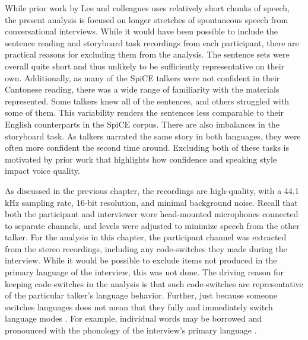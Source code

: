 While prior work by Lee and colleagues \citep[e.g.,][]{lee_2019_acoustic} uses relatively short chunks of speech, the present analysis is focused on longer stretches of spontaneous speech from conversational interviews. While it would have been possible to include the sentence reading and storyboard task recordings from each participant, there are practical reasons for excluding them from the analysis. The sentence sets were overall quite short and thus unlikely to be sufficiently representative on their own. Additionally, as many of the SpiCE talkers were not confident in their Cantonese reading, there was a wide range of familiarity with the materials represented. Some talkers knew all of the sentences, and others struggled with some of them. This variability renders the sentences less comparable to their English counterparts in the SpiCE corpus. There are also imbalances in the storyboard task. As talkers narrated the same story in both languages, they were often more confident the second time around. Excluding both of these tasks is motivated by prior work that highlights how confidence \citep{jarvinen_2013_speaking} and speaking style \citep{lee_2017_bilingual} impact voice quality. 

As discussed in the previous chapter, the recordings are high-quality, with a 44.1 kHz sampling rate, 16-bit resolution, and minimal background noise. Recall that both the participant and interviewer wore head-mounted microphones connected to separate channels, and levels were adjusted to minimize speech from the other talker. For the analysis in this chapter, the participant channel was extracted from the stereo recordings, including any code-switches they made during the interview. While it would be possible to exclude items not produced in the primary language of the interview, this was not done. The driving reason for keeping code-switches in the analysis is that such code-switches are representative of the particular talker's language behavior. Further, just because someone switches languages does not mean that they fully and immediately switch language modes \citep[e.g.,][]{fricke_2016_phonetic}. For example, individual words may be borrowed and pronounced with the phonology of the interview's primary language \citep[cf. the matrix language in code-switching][]{myersscotton_2011_matrix}. 

